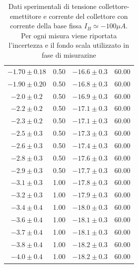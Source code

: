 \documentclass[a4paper,11pt]{article}
\begin{document}
\begin{table}[h!]
\begin{center}
\begin{tabular}{c|c|c|c}
      $ -1.70 \pm 0.18 $    & 0.50                    & $ -16.6 \pm 0.3 $     & 60.00                \\
      $ -1.90 \pm 0.20 $    & 0.50                    & $ -16.8 \pm 0.3 $     & 60.00                \\
      $ -2.0 \pm 0.2 $      & 0.50                    & $ -16.9 \pm 0.3 $     & 60.00                \\
      $ -2.2 \pm 0.2 $      & 0.50                    & $ -17.1 \pm 0.3 $     & 60.00                \\
      $ -2.3 \pm 0.2 $      & 0.50                    & $ -17.1 \pm 0.3 $     & 60.00                \\
      $ -2.5 \pm 0.3 $      & 0.50                    & $ -17.3 \pm 0.3 $     & 60.00                \\
      $ -2.6 \pm 0.3 $      & 0.50                    & $ -17.4 \pm 0.3 $     & 60.00                \\
      $ -2.8 \pm 0.3 $      & 0.50                    & $ -17.6 \pm 0.3 $     & 60.00                \\
      $ -2.9 \pm 0.3 $      & 0.50                    & $ -17.7 \pm 0.3 $     & 60.00                \\
      $ -3.1 \pm 0.3 $      & 1.00                    & $ -17.8 \pm 0.3 $     & 60.00                \\
      $ -3.2 \pm 0.3 $      & 1.00                    & $ -17.9 \pm 0.3 $     & 60.00                \\
      $ -3.4 \pm 0.4 $      & 1.00                    & $ -18.0 \pm 0.3 $     & 60.00                \\
      $ -3.6 \pm 0.4 $      & 1.00                    & $ -18.1 \pm 0.3 $     & 60.00                \\
      $ -3.7 \pm 0.4 $      & 1.00                    & $ -18.1 \pm 0.3 $     & 60.00                \\
      $ -3.8 \pm 0.4 $      & 1.00                    & $ -18.2 \pm 0.3 $     & 60.00                \\
      $ -4.0 \pm 0.4 $      & 1.00                    & $ -18.2 \pm 0.3 $     & 60.00                \\
    \end{tabular}
    \caption{Dati sperimentali di tensione collettore-emettitore e corrente del collettore con corrente della base fissa $I_B \simeq -100 \mu A$. Per ogni misura viene riportata l'incertezza e il fondo scala utilizzato in fase di misurazine }
  \end{center}
\end{table}
\end{document}
